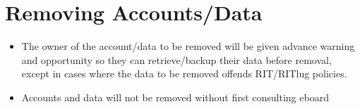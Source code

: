 \section{Removing Accounts/Data}
\begin{itemize}
\item The owner of the account/data to be removed will be given advance warning and opportunity so they can retrieve/backup their data before removal, except in cases where the data to be removed offends RIT/RITlug policies.
\item Accounts and data will not be removed without first consulting eboard
\end{itemize}


